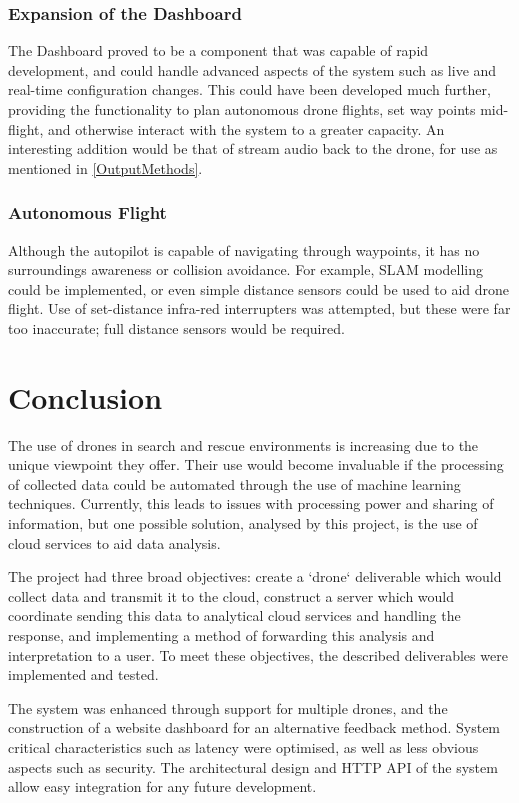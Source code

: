 \documentclass{article}
\begin{document}
\subsubsection{Expansion of the Dashboard}
The Dashboard proved to be a component that was capable of rapid development, and could handle advanced aspects of the system such as live and real-time configuration changes. This could have been developed much further, providing the functionality to plan autonomous drone flights, set way points mid-flight, and otherwise interact with the system to a greater capacity. An interesting addition would be that of stream audio back to the drone, for use as mentioned in \ref{OutputMethods}.

\subsubsection{Autonomous Flight}
Although the autopilot is capable of navigating through waypoints, it has no surroundings awareness or collision avoidance. For example, SLAM modelling could be implemented, or even simple distance sensors could be used to aid drone flight. Use of set-distance infra-red interrupters was attempted, but these were far too inaccurate; full distance sensors would be required. 

\section{Conclusion}

The use of drones in search and rescue environments is increasing due to the unique viewpoint they offer. Their use would become invaluable if the processing of collected data could be automated through the use of machine learning techniques. Currently, this leads to issues with processing power and sharing of information, but one possible solution, analysed by this project, is the use of cloud services to aid data analysis.

The project had three broad objectives: create a `drone` deliverable which would collect data and transmit it to the cloud, construct a server which would coordinate sending this data to analytical cloud services and handling the response, and implementing a method of forwarding this analysis and interpretation to a user. To meet these objectives, the described deliverables were implemented and tested. 

The system was enhanced through support for multiple drones, and the construction of a website dashboard for an alternative feedback method. System critical characteristics such as latency were optimised, as well as less obvious aspects such as security. The architectural design and HTTP API of the system allow easy integration for any future development.
\end{document}
